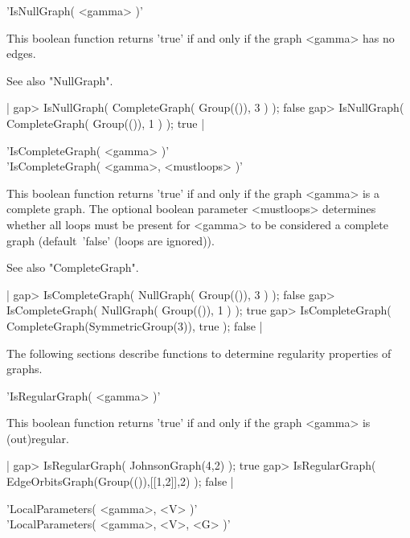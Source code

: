 
'IsNullGraph( <gamma> )'

This boolean function returns 'true' if and only if the graph <gamma> has
no edges.

See also "NullGraph".

|    gap> IsNullGraph( CompleteGraph( Group(()), 3 ) );
    false
    gap> IsNullGraph( CompleteGraph( Group(()), 1 ) );
    true |


'IsCompleteGraph( <gamma> )' \\
'IsCompleteGraph( <gamma>, <mustloops> )'

This boolean function returns  'true' if and only if the graph <gamma> is
a complete graph.  The optional boolean  parameter <mustloops> determines
whether all loops must be present for <gamma> to be considered a complete
graph (default\:\ 'false' (loops are ignored)).

See also "CompleteGraph".

|    gap> IsCompleteGraph( NullGraph( Group(()), 3 ) );
    false
    gap> IsCompleteGraph( NullGraph( Group(()), 1 ) );
    true
    gap> IsCompleteGraph( CompleteGraph(SymmetricGroup(3)), true );
    false |


The  following  sections   describe  functions  to  determine  regularity
properties of graphs.


'IsRegularGraph( <gamma> )'

This boolean function returns 'true'  if and only if the graph <gamma> is
(out)regular.

|    gap> IsRegularGraph( JohnsonGraph(4,2) );
    true
    gap> IsRegularGraph( EdgeOrbitsGraph(Group(()),[[1,2]],2) );
    false |


'LocalParameters( <gamma>, <V> )' \\
'LocalParameters( <gamma>, <V>, <G> )'

